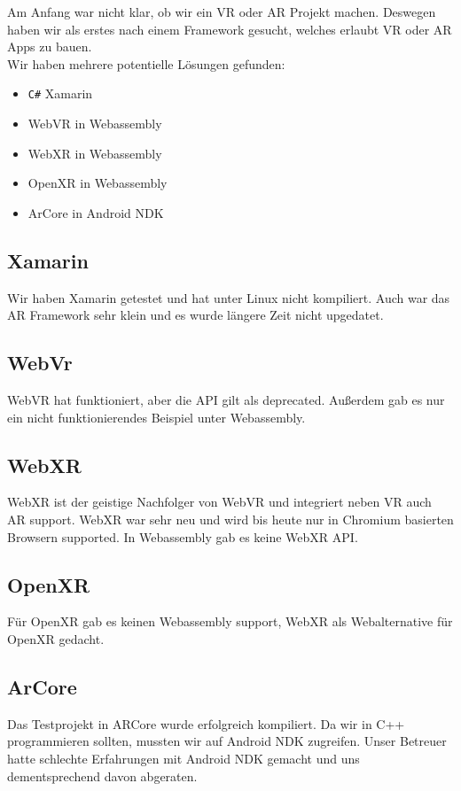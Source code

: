 Am Anfang war nicht klar, ob wir ein VR oder AR Projekt machen. Deswegen haben wir als erstes nach einem Framework gesucht, welches erlaubt VR oder AR Apps zu bauen.
\\
Wir haben mehrere potentielle Lösungen gefunden:

\begin{itemize}
  \item \verb|C#| Xamarin \cite{xamarin}
  \item WebVR in Webassembly \cite{webvr} \cite{webassembly}
  \item WebXR in Webassembly \cite{webxr} \cite{webassembly}
  \item OpenXR in Webassembly \cite{openxr_2016}
  \item ArCore in Android NDK \cite{ar_core}
\end{itemize}

\subsection{Xamarin}
Wir haben Xamarin\cite{xamarin} getestet und hat unter Linux nicht
kompiliert. Auch war das AR
Framework sehr klein und es wurde längere Zeit nicht upgedatet.

\subsection{WebVr}
WebVR\cite{webvr} hat funktioniert, aber die API gilt als deprecated.
Außerdem gab es nur ein nicht
funktionierendes Beispiel unter Webassembly.

\subsection{WebXR}
WebXR\cite{webxr} ist der geistige Nachfolger von WebVR und integriert neben VR auch AR support.
WebXR war sehr neu und wird bis heute nur in Chromium
basierten Browsern
supported. In Webassembly gab es keine WebXR API.

\subsection{OpenXR}
Für OpenXR\cite{openxr_2016} gab es keinen Webassembly support, WebXR als Webalternative für OpenXR gedacht.

\subsection{ArCore}
Das Testprojekt in ARCore\cite{ar_core_sdk} wurde erfolgreich kompiliert.
Da wir in C++ programmieren sollten, mussten wir auf Android NDK\cite{android_ndk} zugreifen.
Unser Betreuer hatte schlechte Erfahrungen mit Android NDK
gemacht und uns dementsprechend davon abgeraten.

